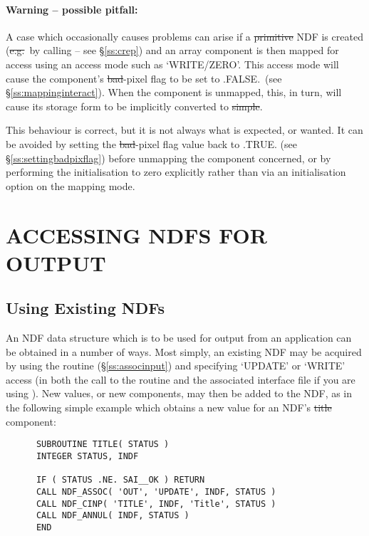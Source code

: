 \paragraph{Warning -- possible pitfall:} A case which occasionally causes
problems can arise if a \st{primitive\/} NDF is created (\st{e.g.}\ by
calling  -- see \S\ref{ss:crep}) and an array component is then
mapped for access using an access mode such as `WRITE/ZERO'. 
This access mode will cause the component's \st{bad}-pixel flag to be set
to .FALSE.\ (see \S\ref{ss:mappinginteract}). 
When the component is unmapped, this, in turn, will cause its storage form
to be implicitly converted to \st{simple}. 

This behaviour is correct, but it is not always what is expected, or wanted.
It can be avoided by setting the \st{bad}-pixel flag value back to
.TRUE. (see \S\ref{ss:settingbadpixflag}) before unmapping the
component concerned,
or by performing the initialisation to zero explicitly rather than via an
initialisation option on the mapping mode. 


\section{ACCESSING NDFS FOR OUTPUT}

\subsection{Using Existing NDFs}

An NDF data structure which is to be used for output from an application can
be obtained in a number of ways. 
Most simply, an existing NDF may be acquired by using the  routine
(\S\ref{ss:associnput}) and specifying `UPDATE' or `WRITE' access (in both the
call to the routine and the associated interface file if you are using
).
New values, or new components, may then be added to the NDF, as in the
following simple example which obtains a new value for an NDF's \st{title\/}
component: 

\small
\begin{verbatim}
      SUBROUTINE TITLE( STATUS )
      INTEGER STATUS, INDF

      IF ( STATUS .NE. SAI__OK ) RETURN
      CALL NDF_ASSOC( 'OUT', 'UPDATE', INDF, STATUS )
      CALL NDF_CINP( 'TITLE', INDF, 'Title', STATUS )
      CALL NDF_ANNUL( INDF, STATUS )
      END
\end{verbatim}
\normalsize

